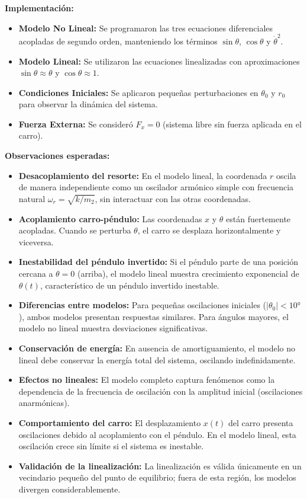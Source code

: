 \documentclass[conference]{IEEEtran}
\begin{document}
\textbf{Implementación:}
\begin{itemize}
\item \textbf{Modelo No Lineal:} Se programaron las tres ecuaciones diferenciales acopladas de segundo orden, manteniendo los términos $\sin\theta$, $\cos\theta$ y $\dot{\theta}^2$.
\item \textbf{Modelo Lineal:} Se utilizaron las ecuaciones linealizadas con aproximaciones $\sin\theta \approx \theta$ y $\cos\theta \approx 1$.
\item \textbf{Condiciones Iniciales:} Se aplicaron pequeñas perturbaciones en $\theta_0$ y $r_0$ para observar la dinámica del sistema.
\item \textbf{Fuerza Externa:} Se consideró $F_x = 0$ (sistema libre sin fuerza aplicada en el carro).
\end{itemize}

\textbf{Observaciones esperadas:}
\begin{itemize}
\item \textbf{Desacoplamiento del resorte:} En el modelo lineal, la coordenada $r$ oscila de manera independiente como un oscilador armónico simple con frecuencia natural $\omega_r = \sqrt{k/m_2}$, sin interactuar con las otras coordenadas.
\item \textbf{Acoplamiento carro-péndulo:} Las coordenadas $x$ y $\theta$ están fuertemente acopladas. Cuando se perturba $\theta$, el carro se desplaza horizontalmente y viceversa.
\item \textbf{Inestabilidad del péndulo invertido:} Si el péndulo parte de una posición cercana a $\theta = 0$ (arriba), el modelo lineal muestra crecimiento exponencial de $\theta(t)$, característico de un péndulo invertido inestable.
\item \textbf{Diferencias entre modelos:} Para pequeñas oscilaciones iniciales ($|\theta_0| < 10°$), ambos modelos presentan respuestas similares. Para ángulos mayores, el modelo no lineal muestra desviaciones significativas.
\item \textbf{Conservación de energía:} En ausencia de amortiguamiento, el modelo no lineal debe conservar la energía total del sistema, oscilando indefinidamente.
\item \textbf{Efectos no lineales:} El modelo completo captura fenómenos como la dependencia de la frecuencia de oscilación con la amplitud inicial (oscilaciones anarmónicas).
\item \textbf{Comportamiento del carro:} El desplazamiento $x(t)$ del carro presenta oscilaciones debido al acoplamiento con el péndulo. En el modelo lineal, esta oscilación crece sin límite si el sistema es inestable.
\item \textbf{Validación de la linealización:} La linealización es válida únicamente en un vecindario pequeño del punto de equilibrio; fuera de esta región, los modelos divergen considerablemente.
\end{itemize}
\end{document}

